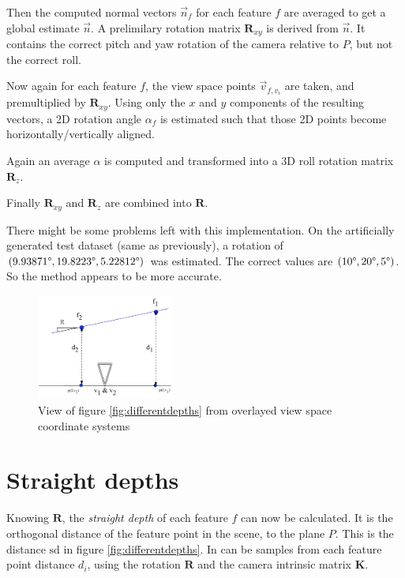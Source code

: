 \documentclass{scrreprt}
\newcommand{\matr}[1]{\mathbf{#1}}
\newcommand{\degr}{\text{\textdegree}}
\begin{document}
Then the computed normal vectors $\vec{n}_f$ for each feature $f$ are averaged to get a global estimate $\vec{n}$. A prelimilary rotation matrix $\matr{R}_{xy}$ is derived from $\vec{n}$. It contains the correct pitch and yaw rotation of the camera relative to $P$, but not the correct roll.

Now again for each feature $f$, the view space points $\vec{v}_{f,v_i}$ are taken, and premultiplied by $\matr{R}_{xy}$. Using only the $x$ and $y$ components of the resulting vectors, a 2D rotation angle $\alpha_f$ is estimated such that those 2D points become horizontally/vertically aligned.

Again an average $\alpha$ is computed and transformed into a 3D roll rotation matrix $\matr{R}_z$.

Finally $\matr{R}_{xy}$ and $\matr{R}_z$ are combined into $\matr{R}$.

There might be some problems left with this implementation. On the artificially generated test dataset (same as previously), a rotation of $(9.93871\degr, 19.8223\degr, 5.22812\degr)$ was estimated. The correct values are $(10\degr, 20\degr, 5\degr)$. So the method appears to be more accurate.


\begin{figure}
\centering
\includegraphics[width=0.4\textwidth]{differentdepthsview.pdf}
\caption{View of figure \ref{fig:differentdepths} from overlayed view space coordinate systems}
\label{fig:differentdepthsview}
\end{figure}


\pagebreak

\section{Straight depths}
\label{ref:straightdepths}
Knowing $\matr{R}$, the \emph{straight depth} of each feature $f$ can now be calculated. It is the orthogonal distance of the feature point in the scene, to the plane $P$. This is the distance $\text{sd}$ in figure \ref{fig:differentdepths}. In can be samples from each feature point distance $d_i$, using the rotation $\matr{R}$ and the camera intrinsic matrix $\matr{K}$.
\end{document}
